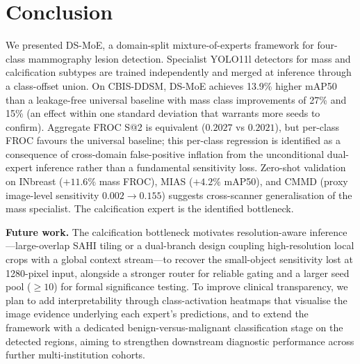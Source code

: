 \documentclass[runningheads]{llncs}
\begin{document}
\section{Conclusion}
\label{sec:conclusion}

We presented DS-MoE, a domain-split mixture-of-experts framework for
four-class mammography lesion detection. Specialist YOLO11l detectors
for mass and calcification subtypes are trained independently and merged
at inference through a class-offset union. On CBIS-DDSM, DS-MoE
achieves 13.9\% higher mAP50 than a leakage-free universal baseline
with mass class improvements of 27\% and 15\% (an effect within one
standard deviation that warrants more seeds to confirm). Aggregate FROC
S@2 is equivalent ($0.2027$ vs $0.2021$), but per-class FROC favours the
universal baseline; this per-class regression is identified as a
consequence of cross-domain false-positive inflation from the
unconditional dual-expert inference rather than a fundamental
sensitivity loss. Zero-shot validation on INbreast ($+11.6\%$ mass
FROC), MIAS ($+4.2\%$ mAP50), and CMMD (proxy image-level sensitivity
$0.002 \rightarrow 0.155$) suggests cross-scanner generalisation of the
mass specialist. The calcification expert is the identified bottleneck.

\noindent\textbf{Future work.} The calcification bottleneck motivates
resolution-aware inference---large-overlap SAHI tiling or a dual-branch
design coupling high-resolution local crops with a global context
stream---to recover the small-object sensitivity lost at 1280-pixel
input, alongside a stronger router for reliable gating and a larger seed
pool ($\geq 10$) for formal significance testing. To improve clinical
transparency, we plan to add interpretability through class-activation
heatmaps that visualise the image evidence underlying each expert's
predictions, and to extend the framework with a dedicated
benign-versus-malignant classification stage on the detected regions,
aiming to strengthen downstream diagnostic performance across further
multi-institution cohorts.
\end{document}
